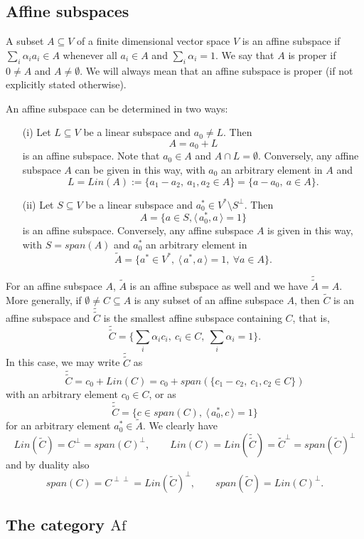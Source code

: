 \documentclass[12pt]{article}
\theoremstyle{definition}
\theoremstyle{remark}
\def\<{\langle\,}
\def\>{\,\rangle}
\def \Af{\mathrm{Af}}
\begin{document}
\subsection{Affine subspaces}

A subset $A\subseteq V$ of a finite dimensional vector space $V$ is an affine subspace if 
$\sum_i\alpha_i a_i\in A$ whenever all $a_i\in A$ and $\sum_i\alpha_i=1$. We say that $A$
is proper if $0\ne A$ and $A\ne \emptyset$. We will always
mean  that an affine subspace is proper (if not explicitly stated otherwise).

An affine
subspace can be determined in two ways:
\begin{enumerate}
\item[(i)] Let $L\subseteq V$ be a linear subspace and $a_0\ne L$. Then 
\[
A=a_0+L
\]
is an affine subspace.  Note that $a_0\in A$ and $A\cap L=\emptyset$.
Conversely, any affine subspace $A$ can be given in this way, with $a_0$ an arbitrary element in $A$ and
\[
L=Lin(A):=\{a_1-a_2,\ a_1,a_2\in A\}=\{a-a_0,\ a\in A\}.
\]
\item[(ii)] Let $S\subseteq V$ be a linear subspace and $a_0^*\in V^*\setminus S^\perp$. Then
\[
A=\{a\in S, \<a_0^*,a\>=1\}
\]
is an affine subspace. Conversely, any affine subspace $A$ is given in this way, with
$S=span(A)$ and $a_0^*$ an arbitrary element in 
\[
\tilde A=\{a^*\in V^*,\ \<a^*,a\>=1,\ \forall a\in A\}.
\]
\end{enumerate}

For an affine subspace $A$, $\tilde A$ is an affine subspace as well and we have
$\tilde{\tilde A}=A$. More generally, if $\emptyset\ne C\subseteq A$ is any  subset of an affine
subspace $A$, then $\tilde C$ is an affine subspace 
and $\tilde{\tilde C}$ is the smallest
affine subspace containing $C$, that is,
\[
\tilde{\tilde C}=\{\sum_i \alpha_i c_i,\ c_i\in C,\ \sum_i\alpha_i=1\}.
\]
In this case, we may write $\tilde{\tilde C}$ as
\[
\tilde{\tilde C}=c_0+Lin(C)=c_0+span(\{c_1-c_2,\ c_1,c_2\in C\})
\]
with an arbitrary element $c_0\in C$, or as
\[
\tilde{\tilde C}=\{c\in span(C),\ \<a_0^*,c\>=1\}
\]
for an arbitrary element $a_0^*\in \tilde A$. We clearly have
\[
Lin(\tilde C)=C^\perp=span(C)^\perp,\qquad Lin(C)=Lin(\tilde{\tilde C})=\tilde
C^\perp=span(\tilde C)^\perp
\]
and by duality also
\[
span(C)=C^{\perp\perp} =Lin(\tilde C)^\perp,\qquad span(\tilde C)=Lin(C)^\perp.
\]





\subsection{The category $\Af$}
\end{document}
